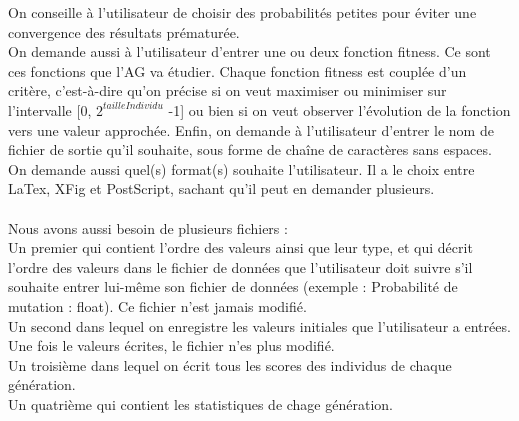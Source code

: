 \documentclass[a4paper,11pt]{article}
\begin{document}
		On conseille à l’utilisateur de choisir des probabilités petites pour éviter une convergence des résultats prématurée.\\
		On demande aussi à l’utilisateur d’entrer une ou deux fonction fitness.
		Ce sont ces fonctions que l’AG va étudier.
		Chaque fonction fitness est couplée d’un critère, c’est-à-dire qu’on précise si on veut maximiser ou minimiser sur l’intervalle [0, $2^{tailleIndividu}$ -1] ou bien si on veut observer l’évolution de la fonction vers une valeur approchée.
		Enfin, on demande à l’utilisateur d’entrer le nom de fichier de sortie qu’il souhaite, sous forme de chaîne de caractères sans espaces.
		On demande aussi quel(s) format(s) souhaite l’utilisateur.
		Il a le choix entre LaTex, XFig et PostScript, sachant qu’il peut en demander plusieurs.\\
		\\
		Nous avons aussi besoin de plusieurs fichiers :\\

		Un premier qui contient l’ordre des valeurs ainsi que leur type, et qui décrit l'ordre des valeurs dans le fichier de données que l'utilisateur doit suivre s'il souhaite entrer lui-même son fichier de données (exemple : Probabilité de mutation : float). Ce fichier n'est jamais modifié.\\
		Un second dans lequel on enregistre les valeurs initiales que l'utilisateur a entrées. Une fois le valeurs écrites, le fichier n'es plus modifié.\\
		Un troisième dans lequel on écrit tous les scores des individus de chaque génération.\\
		Un quatrième qui contient les statistiques de chage génération.\\

		
\end{document}
